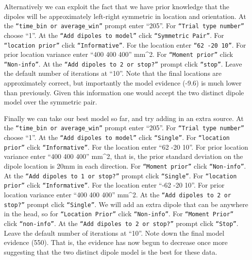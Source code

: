 Alternatively we can exploit the fact that we have prior knowledge that the dipoles will be approximately left-right symmetric in location and orientation. At the \texttt{``time\_bin or average\_win''} prompt enter ``205''.  For \texttt{``Trial type number''} choose ``1''. At the \texttt{``Add dipoles to model''} click \texttt{``Symmetric Pair''}. For \texttt{``location prior''} click \texttt{``Informative''}. For the location enter \texttt{``62 -20 10''}. For prior location variance enter ``400 400 400'' mm^2. For \texttt{``Moment prior''} click \texttt{``Non-info''}. At the \texttt{``Add dipoles to 2 or stop?''} prompt click \texttt{``stop''}. Leave the default number of iterations at ``10''. Note that the final locations are approximately correct, but importantly the model evidence (-9.6) is much lower than previously. Given this information one would accept the two distinct dipole model over the symmetric pair. 

Finally we can take our best model so far, and try adding in an extra source.
At the \texttt{``time\_bin or average\_win''} prompt enter ``205''. For \texttt{``Trial type number''} choose ``1''. At the \texttt{``Add dipoles to model''} click \texttt{``Single''}. For \texttt{``location prior''} click \texttt{``Informative''}. For the location enter ``62 -20 10''. For prior location variance enter ``400 400 400'' mm^2, that is, the prior standard deviation on the dipole location is 20mm in each direction. For \texttt{``Moment prior''} click \texttt{``Non-info''}. At the \texttt{``Add dipoles to 1 or stop?''} prompt click \texttt{``Single''}. For \texttt{``location prior''} click \texttt{``Informative''}. For the location enter ``-62 -20 10''. For prior location variance enter ``400 400 400'' mm^2. At the \texttt{``Add dipoles to 2 or stop?''} prompt click \texttt{``Single''}. We will add an extra dipole that can be anywhere in the head, so for \texttt{``Location Prior''} click \texttt{``Non-info''}. For \texttt{``Moment Prior''} click \texttt{``non-info''}. At the \texttt{``Add dipoles to 2 or stop?''} prompt click \texttt{``Stop''}. Leave the default number of iterations at ``10''. Note down the final model evidence (550). That is, the evidence has now begun to decrease once more suggesting that the two distinct dipole model is the best for these data.

